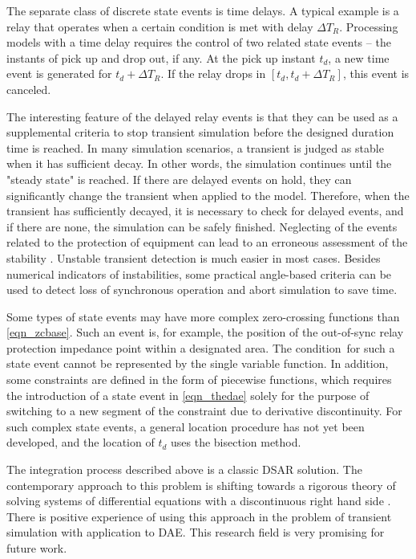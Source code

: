 \documentclass[lettersize,journal]{IEEEtran}
\begin{document}
The separate class of discrete state events is time delays. A typical example is a relay that operates when a certain condition is met with delay \(\Delta T_R\). Processing models with a time delay requires the control of two related state events -- the instants of pick up and drop out, if any. At the pick up instant \(t_d\), a new time event is generated for \(t_d+\Delta T_R\). If the relay drops in \(\left[t_d, t_d+\Delta T_R \right]\), this event is canceled.

The interesting feature of the delayed relay events is that they can be used as a supplemental criteria to stop transient simulation before the designed duration time is reached. In many simulation scenarios, a transient is judged as stable when it has sufficient decay. In other words, the simulation continues until the "steady state" is reached. If there are delayed events on hold, they can significantly change the transient when applied to the model. Therefore, when the transient has sufficiently decayed, it is necessary to check for delayed events, and if there are none, the simulation can be safely finished. Neglecting of the events related to the protection of equipment can lead to an erroneous assessment of the stability \cite{VanCutsem2020}. Unstable transient detection is much easier in most cases. Besides numerical indicators of instabilities, some practical angle-based criteria can be used to detect loss of synchronous operation and abort simulation to save time.

Some types of state events may have more complex zero-crossing functions than \eqref{eqn_zcbase}. Such an event is, for example, the position of the out-of-sync relay protection impedance point within a designated area. The condition for such a state event cannot be represented by the single variable function. In addition, some constraints are defined in the form of piecewise functions, which requires the introduction of a state event in \eqref{eqn_thedae} solely for the purpose of switching to a new segment of the constraint due to derivative discontinuity. For such complex state events, a general location procedure has not yet been developed, and the location of \(t_d\) uses the bisection method.

The integration process described above is a classic DSAR solution. The contemporary approach to this problem is shifting towards a rigorous theory of solving systems of differential equations with a discontinuous right hand side \cite{Filippov1988}. There is positive experience of using this approach in the problem of transient simulation \cite{Murad2019} with application to DAE. This research field is very promising for future work.
\end{document}
